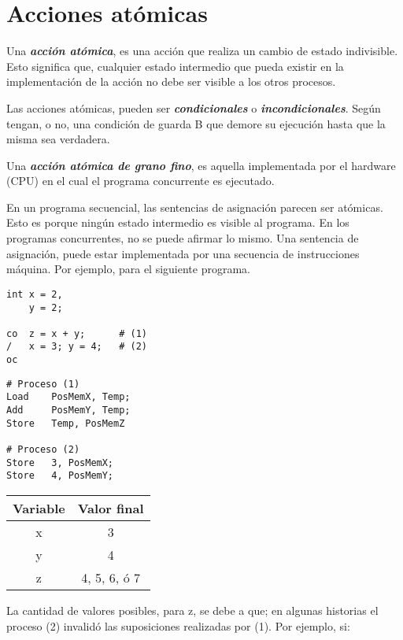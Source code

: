 \documentclass[a4paper, 10pt]{report}
\begin{document}
\section{Acciones atómicas}

Una \textbf{\emph{acción atómica}}, es una acción que realiza un cambio de estado indivisible. Esto significa que, cualquier estado intermedio que pueda existir en la implementación de la acción no debe ser visible a los otros procesos.

Las acciones atómicas, pueden ser \textbf{\emph{condicionales}} o \textbf{\emph{incondicionales}}. Según tengan, o no, una condición de guarda B que demore su ejecución hasta que la misma sea verdadera.

Una \textbf{\emph{acción atómica de grano fino}}, es aquella implementada por el hardware (CPU) en el cual el programa concurrente es ejecutado.

En un programa secuencial, las sentencias de asignación parecen ser atómicas. Esto es porque ningún estado intermedio es visible al programa. En los programas concurrentes, no se puede afirmar lo mismo. Una sentencia de asignación, puede estar implementada por una secuencia de instrucciones máquina. Por ejemplo, para el siguiente programa.

\begin{multicols}{3}
\begin{lstlisting}
int x = 2,
	y = 2;

co  z = x + y;      # (1)
/   x = 3; y = 4;   # (2)
oc
\end{lstlisting}
\columnbreak
\begin{lstlisting}
# Proceso (1)
Load    PosMemX, Temp;
Add     PosMemY, Temp;
Store   Temp, PosMemZ

# Proceso (2)
Store   3, PosMemX;
Store   4, PosMemY;
\end{lstlisting}
\columnbreak
{\renewcommand{\arraystretch}{1.5}%
\centering
\begin{tabular}{cc}
	\textbf{Variable} & \textbf{Valor final}\\
	\hline 
	x & 3\\ 
	y & 4\\ 
	z & 4, 5, 6, ó 7\\
\end{tabular}}
\end{multicols}


La cantidad de valores posibles, para z, se debe a que; en algunas historias el proceso (2) invalidó las suposiciones realizadas por (1). Por ejemplo, si:
\end{document}
